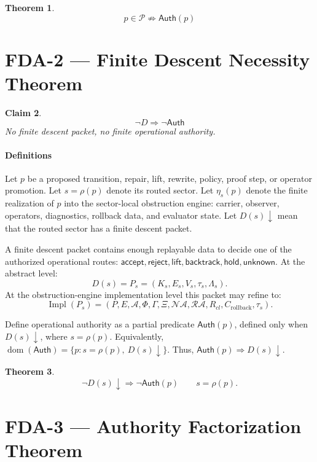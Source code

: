 \documentclass[11pt]{article}
\newtheorem{theorem}{Theorem}[section]
\newtheorem{claim}[theorem]{Claim}
\begin{document}
\begin{theorem}
\[
\boxed{
p\in\mathcal P \not\Rightarrow \mathsf{Auth}(p)
}
\]
\end{theorem}

\section{FDA-2 — Finite Descent Necessity Theorem}

\begin{claim}
\[
\boxed{\neg D \Rightarrow \neg \mathsf{Auth}}
\]
No finite descent packet, no finite operational authority.
\end{claim}

\paragraph{Definitions}
Let \(p\) be a proposed transition, repair, lift, rewrite, policy, proof step, or operator promotion. Let \(s=\rho(p)\) denote its routed sector. Let \(\eta_s(p)\) denote the finite realization of \(p\) into the sector-local obstruction engine: carrier, observer, operators, diagnostics, rollback data, and evaluator state. Let \(D(s)\downarrow\) mean that the routed sector has a finite descent packet.

A finite descent packet contains enough replayable data to decide one of the authorized operational routes: \(\mathsf{accept}, \mathsf{reject}, \mathsf{lift}, \mathsf{backtrack}, \mathsf{hold}, \mathsf{unknown}\). At the abstract level:
\[
D(s)=P_s = (K_s,E_s,V_s,\tau_s,\Lambda_s).
\]
At the obstruction-engine implementation level this packet may refine to:
\[
\operatorname{Impl}(P_s) = (P,E,\mathcal A,\Phi,\Gamma,\Xi,\mathcal{NA},\mathcal{RA},R_{cl},C_{\mathrm{rollback}},\tau_s).
\]

Define operational authority as a partial predicate \(\mathsf{Auth}(p)\), defined only when \(D(s)\downarrow\), where \(s=\rho(p)\). Equivalently, \(\operatorname{dom}(\mathsf{Auth}) = \{p : s=\rho(p),\ D(s)\downarrow\}\). Thus, \(\mathsf{Auth}(p) \Rightarrow D(s)\downarrow\).

\begin{theorem}
\[
\boxed{
\neg D(s)\downarrow \Rightarrow \neg \mathsf{Auth}(p)
}
\qquad s=\rho(p).
\]
\end{theorem}

\section{FDA-3 — Authority Factorization Theorem}
\end{document}
